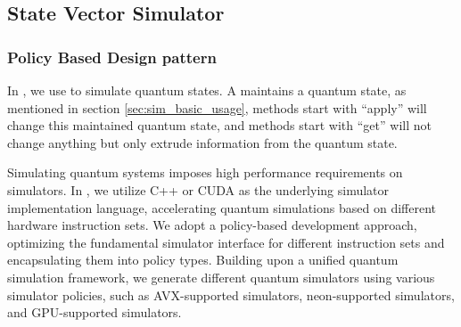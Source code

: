 \subsection{State Vector Simulator}
\label{sec_state_vec}
\subsubsection{Policy Based Design pattern}
In \MindQuantum, we use \Simulator to simulate quantum states. A \Simulator maintains a quantum state, as mentioned in section \ref{sec:sim_basic_usage}, methods start with ``apply'' will change this maintained quantum state, and methods start with ``get'' will not change anything but only extrude information from the quantum state.

Simulating quantum systems imposes high performance requirements on simulators. In \MindQuantum, we utilize C++ or CUDA as the underlying simulator implementation language, accelerating quantum simulations based on different hardware instruction sets. We adopt a policy-based development approach, optimizing the fundamental simulator interface for different instruction sets and encapsulating them into policy types. Building upon a unified quantum simulation framework, we generate different quantum simulators using various simulator policies, such as AVX-supported simulators, neon-supported simulators, and GPU-supported simulators.

